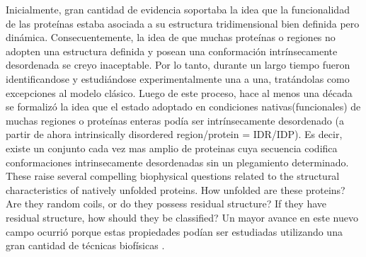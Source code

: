 Inicialmente, gran cantidad de evidencia soportaba la idea que la funcionalidad de las proteínas estaba asociada a su estructura tridimensional bien definida pero dinámica.
Consecuentemente, la idea de que muchas proteínas o regiones no adopten una estructura definida y posean una conformación intrínsecamente desordenada se creyo inaceptable. 
Por lo tanto, durante un largo tiempo fueron identificandose y estudiándose experimentalmente una a una, tratándolas como excepciones al modelo clásico.
Luego de este proceso, hace al menos una década se formalizó la idea que el estado adoptado en condiciones nativas(funcionales) de muchas regiones o proteínas enteras podía ser intrínsecamente desordenado
(a partir de ahora intrinsically disordered region/protein = IDR/IDP).
Es decir, existe un conjunto cada vez mas amplio de proteinas cuya secuencia codifica conformaciones intrinsecamente desordenadas sin un plegamiento determinado.
These raise several compelling biophysical questions related to the structural characteristics of natively unfolded proteins. 
How unfolded are these proteins? Are they random coils, or do they possess residual structure? If they have residual structure, how should they be classified?
Un mayor avance en este nuevo campo ocurrió porque estas propiedades podían ser estudiadas utilizando una gran cantidad de técnicas biofísicas \cite{eliezer2009biophysical}.

